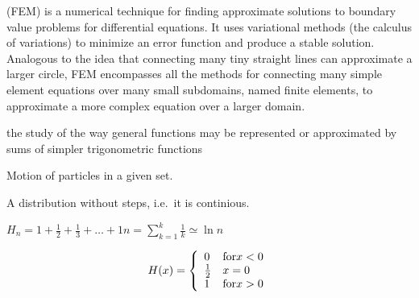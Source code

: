 \begin{definition}
    (FEM) is a numerical technique for finding approximate solutions to
    boundary value problems for differential equations. It uses variational
    methods (the calculus of variations) to minimize an error function and
    produce a stable solution.  Analogous to the idea that connecting many tiny
    straight lines can approximate a larger circle, FEM encompasses all the
    methods for connecting many simple element equations over many small
    subdomains, named finite elements, to approximate a more complex equation
    over a larger domain.

\end{definition}

\begin{definition}

\end{definition}

\begin{definition}
    the study of the way general functions may be represented or approximated
    by sums of simpler trigonometric functions

\end{definition}

\begin{definition}[Flow]
    Motion of particles in a given set.
\end{definition}

\begin{definition}
   A distribution without steps, i.e.\ it is continious. 
\end{definition}

\begin{definition}
    $H_{n} = 1 + \frac{1}{2} + \frac{1}{3} + \dots + {1}{n} =
    {\sum\limits_{k = 1}^{k}} \frac{1}{k} \simeq \ln n$
\end{definition}

\begin{definition}
    $$
    H(x) = \left\{
            \begin{array}{l l}
                0 & \text{for} x < 0 \\
                \frac{1}{2} & x = 0 \\
                1 & \text{for} x > 0 \\
            \end{array}
        \right.
    $$
\end{definition}

